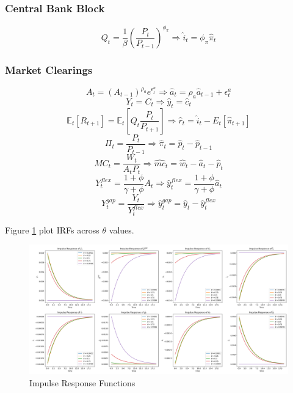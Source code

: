 \documentclass[12pt]{article}
\newcommand{\E}{\mathbb{E}}
\begin{document}
\subsubsection*{Central Bank Block}
\begin{equation}
\label{eq:taylor_rule}
Q_{t} = \frac{1}{\beta}\left(\frac{P_{t}}{P_{t-1}}\right)^{\phi_{\pi}}
\Rightarrow
\hat{i}_{t} = \phi_{\pi}\hat{\pi}_{t}
\end{equation}

\subsubsection*{Market Clearings}
\begin{equation}
\label{eq:a_shock}
A_{t} = \left(A_{t-1}\right)^{\rho_{a}}e^{\epsilon^{a}_{t}}
\Rightarrow
\hat{a}_{t} = \rho_{a}\hat{a}_{t-1} + \epsilon^{a}_{t}
\end{equation}
\begin{equation}
\label{eq:output}
Y_{t} = C_{t} 
\Rightarrow
\hat{y}_{t} = \hat{c}_{t}
\end{equation}
\begin{equation}
\label{eq:fisher}
\E_{t}\left[R_{t+1}\right]=\E_{t}\left[Q_{t}\frac{P_{t}}{P_{t+1}}\right]
\Rightarrow
\hat{r}_{t} = \hat{i}_{t} - E_{t}\left[\hat{\pi}_{t+1}\right]
\end{equation}
\begin{equation}
\label{eq:pi}
\Pi_{t} = \frac{P_{t}}{P_{t-1}}
\Rightarrow
\hat{\pi}_{t} = \hat{p}_{t} - \hat{p}_{t-1}
\end{equation}
\begin{equation}
\label{eq:mc}
MC_{t} = \frac{W_{t}}{A_{t}P_{t}}
\Rightarrow
\hat{mc}_{t} = \hat{w}_{t}-\hat{a}_{t}-\hat{p}_{t}
\end{equation}
\begin{equation}
\label{eq:y_flex}
Y^{flex}_{t} = \frac{1+\phi}{\gamma+\phi}A_{t}
\Rightarrow
\hat{y}^{flex}_{t} = \frac{1+\phi}{\gamma+\phi}\hat{a}_{t}
\end{equation}
\begin{equation}
Y^{gap}_{t} = \frac{Y_{t}}{Y^{flex}_{t}}
\Rightarrow
\hat{y}^{gap}_{t} = \hat{y}_{t} - \hat{y}^{flex}_{t}
\end{equation}

Figure \ref{fig:q2_irf} plot IRFs across $\theta$ values.
\begin{figure}[ht]
\centering
\includegraphics[width=1.0\textwidth]{figs/q2_IRFs.png}
\caption{Impulse Response Functions}
\label{fig:q2_irf}
\end{figure}
\end{document}

